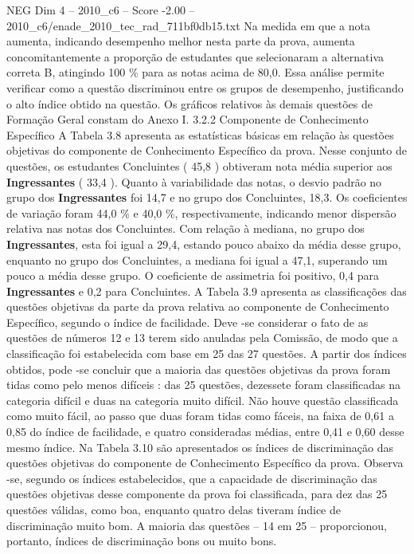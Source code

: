 \begin{textsample}{NEG Dim 4 – 2010\_c6 – Score -2.00 – 2010\_c6/enade\_2010\_tec\_rad\_711bf0db15.txt}
Na medida em que a nota aumenta, indicando desempenho melhor nesta parte da prova, aumenta concomitantemente a proporção de estudantes que selecionaram a alternativa correta B, atingindo 100 \% para as notas acima de 80,0.
Essa análise permite verificar como a questão discriminou entre os grupos de desempenho, justificando o alto índice obtido na questão.
Os gráficos relativos às demais questões de Formação Geral constam do Anexo I. 3.2.2 Componente de Conhecimento Específico A Tabela 3.8 apresenta as estatísticas básicas em relação às questões objetivas do componente de Conhecimento Específico da prova.
Nesse conjunto de questões, os estudantes Concluintes ( 45,8 ) obtiveram nota média superior aos \textbf{Ingressantes} ( 33,4 ).
Quanto à variabilidade das notas, o desvio padrão no grupo dos \textbf{Ingressantes} foi 14,7 e no grupo dos Concluintes, 18,3.
Os coeficientes de variação foram 44,0 \% e 40,0 \%, respectivamente, indicando menor dispersão relativa nas notas dos Concluintes.
Com relação à mediana, no grupo dos \textbf{Ingressantes}, esta foi igual a 29,4, estando pouco abaixo da média desse grupo, enquanto no grupo dos Concluintes, a mediana foi igual a 47,1, superando um pouco a média desse grupo.
O coeficiente de assimetria foi positivo, 0,4 para \textbf{Ingressantes} e 0,2 para Concluintes.
A Tabela 3.9 apresenta as classificações das questões objetivas da parte da prova relativa ao componente de Conhecimento Específico, segundo o índice de facilidade.
Deve -se considerar o fato de as questões de números 12 e 13 terem sido anuladas pela Comissão, de modo que a classificação foi estabelecida com base em 25 das 27 questões.
A partir dos índices obtidos, pode -se concluir que a maioria das questões objetivas da prova foram tidas como pelo menos difíceis : das 25 questões, dezessete foram classificadas na categoria difícil e duas na categoria muito difícil.
Não houve questão classificada como muito fácil, ao passo que duas foram tidas como fáceis, na faixa de 0,61 a 0,85 do índice de facilidade, e quatro consideradas médias, entre 0,41 e 0,60 desse mesmo índice.
Na Tabela 3.10 são apresentados os índices de discriminação das questões objetivas do componente de Conhecimento Específico da prova.
Observa -se, segundo os índices estabelecidos, que a capacidade de discriminação das questões objetivas desse componente da prova foi classificada, para dez das 25 questões válidas, como boa, enquanto quatro delas tiveram índice de discriminação muito bom.
A maioria das questões – 14 em 25 – proporcionou, portanto, índices de discriminação bons ou muito bons.

\end{textsample}
